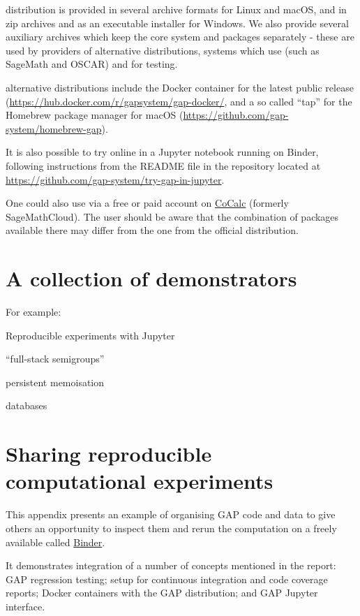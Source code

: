 \documentclass{deliverablereport}
\begin{document}
\GAP distribution is provided in several archive formats for Linux and macOS,
and in zip archives and as an executable installer for Windows.
We also provide several auxiliary archives which keep the core system
and packages separately - these are used by providers of alternative
distributions, systems which use \GAP (such as SageMath and OSCAR)
and for testing.

\GAP alternative distributions include the Docker container for the 
latest public \GAP release (\url{https://hub.docker.com/r/gapsystem/gap-docker/},
and a so called ``tap'' for the Homebrew package manager for macOS
(\url{https://github.com/gap-system/homebrew-gap}). 

It is also possible to try \GAP online in a Jupyter notebook running 
on Binder, following instructions from the README file in the repository
located at \url{https://github.com/gap-system/try-gap-in-jupyter}.

One could also use \GAP via a free or paid account
on \href{https://cocalc.com/}{CoCalc} (formerly SageMathCloud).
The user should be aware that the combination of \GAP packages 
available there may differ from the one from the official \GAP distribution.


\section{A collection of demonstrators}\label{demos}

For example:

Reproducible experiments with Jupyter

``full-stack semigroups''

persistent memoisation

databases

\newpage
\appendix

\section{Sharing reproducible computational experiments}\label{repro-gap}

This appendix presents an example of organising GAP code 
and data to give others an opportunity to inspect them and rerun
the computation on a freely available called \href{https://mybinder.org/}{Binder}.

It demonstrates integration of a number of concepts mentioned
in the report: GAP regression testing; setup for continuous
integration and code coverage reports; Docker containers with
the GAP distribution; and GAP Jupyter interface.
\end{document}
